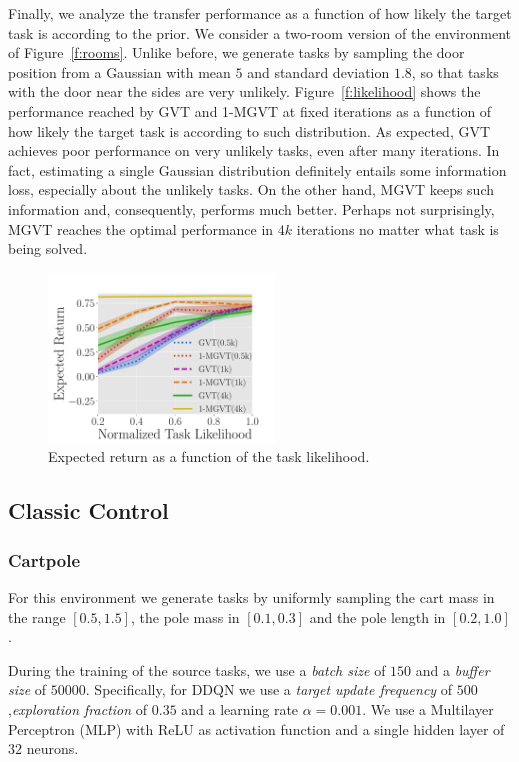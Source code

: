 \documentclass{article}
\begin{document}
Finally, we analyze the transfer performance as a function of how likely the target task is according to the prior. We consider a two-room version of the environment of Figure~\ref{f:rooms}. Unlike before, we generate tasks by sampling the door position from a Gaussian with mean $5$ and standard deviation $1.8$, so that tasks with the door near the sides are very unlikely. Figure~\ref{f:likelihood} shows the performance reached by GVT and 1-MGVT at fixed iterations as a function of how likely the target task is according to such distribution. As expected, GVT achieves poor performance on very unlikely tasks, even after many iterations. In fact, estimating a single Gaussian distribution definitely entails some information loss, especially about the unlikely tasks. On the other hand, MGVT keeps such information and, consequently, performs much better. Perhaps not surprisingly, MGVT reaches the optimal performance in $4k$ iterations no matter what task is being solved.

\begin{figure}[t]
\centering
    \includegraphics[trim=0.0cm 0cm 1.2cm 1.3cm,clip=true,height=4.5cm]{images/likelihood/lrew.pdf}
    \caption{Expected return as a function of the task likelihood.}
  \label{fig:likelihood}
\end{figure}


\subsection{Classic Control}

\subsubsection{Cartpole}

For this environment we generate tasks by uniformly sampling the cart mass in the range $\left[0.5,1.5\right]$, the pole mass in $\left[0.1,0.3\right]$ and the pole length in $\left[0.2,1.0\right]$. 

During the training of the source tasks, we use a \textit{batch size} of $150$ and a \textit{buffer size} of $50000$. Specifically, for DDQN we use a \textit{target update frequency} of $500$,\textit{exploration fraction} of $0.35$ and a learning rate $\alpha=0.001$. We use a Multilayer Perceptron (MLP) with ReLU as activation function and a single hidden layer of $32$ neurons.
\end{document}
